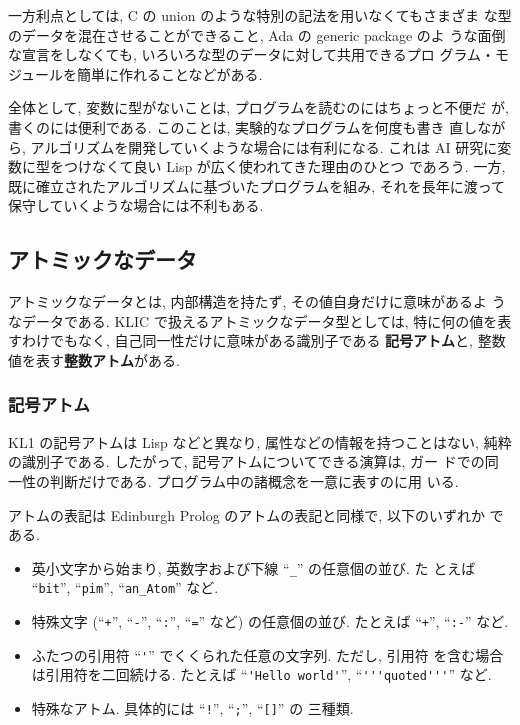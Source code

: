 \documentclass[a4,titlepage]{jsreport}
\let\dg\bf
\begin{document}
一方利点としては, C の union のような特別の記法を用いなくてもさまざま
な型のデータを混在させることができること, Ada の generic package のよ
うな面倒な宣言をしなくても, いろいろな型のデータに対して共用できるプロ
グラム・モジュールを簡単に作れることなどがある.

全体として, 変数に型がないことは, プログラムを読むのにはちょっと不便だ
が, 書くのには便利である.  このことは, 実験的なプログラムを何度も書き
直しながら, アルゴリズムを開発していくような場合には有利になる. これは 
AI 研究に変数に型をつけなくて良い Lisp が広く使われてきた理由のひとつ
であろう.  一方, 既に確立されたアルゴリズムに基づいたプログラムを組み, 
それを長年に渡って保守していくような場合には不利もある.

\subsection{アトミックなデータ}
アトミックなデータとは, 内部構造を持たず, その値自身だけに意味があるよ
うなデータである.  KLIC で扱えるアトミックなデータ型としては, 
特に何の値を表すわけでもなく, 自己同一性だけに意味がある識別子である
{\bf\dg 記号アトム}と, 整数値を表す{\bf\dg 整数アトム}がある.

\subsubsection{記号アトム}
KL1 の記号アトムは Lisp などと異なり, 属性などの情報を持つことはない, 
純粋の識別子である.  したがって, 記号アトムについてできる演算は, ガー
ドでの同一性の判断だけである.  プログラム中の諸概念を一意に表すのに用
いる.

アトムの表記は Edinburgh Prolog のアトムの表記と同様で, 以下のいずれか
である.
\begin{itemize}
\item
英小文字から始まり, 英数字および下線 ``\verb^_^'' の任意個の並び.  た
とえば ``\verb|bit|'', ``\verb|pim|'', ``\verb|an_Atom|'' など.
\item
特殊文字 (``\verb|+|'', ``\verb|-|'', ``\verb|:|'', ``\verb|=|'' など) 
の任意個の並び.  たとえば ``\verb|+|'', ``\verb|:-|'' など.
\item
ふたつの引用符 ``\verb|'|'' でくくられた任意の文字列.  ただし, 引用符
を含む場合は引用符を二回続ける.  たとえば ``\verb|'Hello world'|'', 
``\verb|'''quoted'''|'' など.
\item
特殊なアトム.  具体的には ``\verb|!|'', ``\verb|;|'', ``\verb|[]|'' の
三種類.
\end{itemize}
\end{document}
